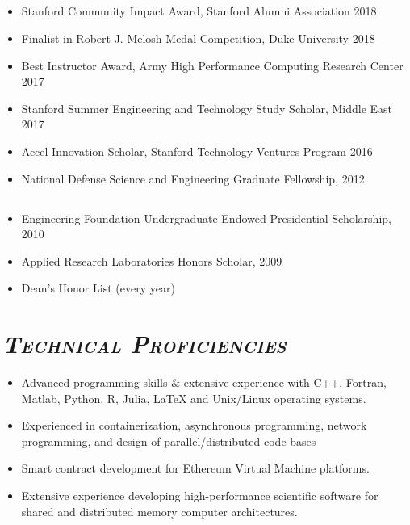 \documentclass[10pt]{article}
\begin{document}
\subsection*{\sl \normalsize \underline{}} 
\begin{itemize}
	\setlength{\itemsep}{0pt}
	\setlength{\parskip}{0pt}
	\item Stanford Community Impact Award, Stanford Alumni Association 2018
	\item Finalist in Robert J. Melosh Medal Competition, Duke University 2018
	\item Best Instructor Award, Army High Performance Computing Research Center 2017
	\item Stanford Summer Engineering and Technology Study Scholar, Middle East 2017
	\item Accel Innovation Scholar, Stanford Technology Ventures Program 2016
	\item National Defense Science and Engineering Graduate Fellowship, 2012
\end{itemize}

\subsection*{\sl \normalsize \underline{}}
\begin{itemize}
	\setlength{\itemsep}{0pt}
	\setlength{\parskip}{0pt}
	\item Engineering Foundation Undergraduate Endowed Presidential Scholarship, 2010 	
	\item Applied Research Laboratories Honors Scholar, 2009 
	\item Dean's Honor List (every year) 
\end{itemize}

\section*{\sl {\bfseries{\textsc{\large Technical Proficiencies}}}}
\begin{itemize}
	\setlength{\itemsep}{0pt}
	\setlength{\parskip}{0pt}
	\item Advanced programming skills \& extensive experience with C++, Fortran, Matlab, Python, R, Julia, LaTeX and Unix/Linux operating systems. 
	\item Experienced in containerization, asynchronous programming, network programming, and design of parallel/distributed code bases
    \item Smart contract development for Ethereum Virtual Machine platforms. 
	\item Extensive experience developing high-performance scientific software for shared and distributed memory computer architectures. 
\end{itemize}
\end{document}
